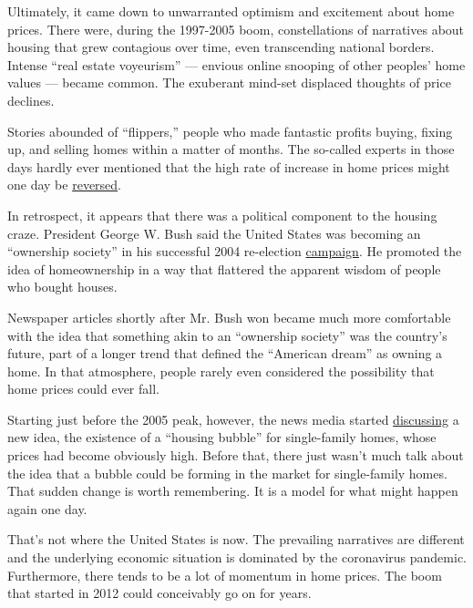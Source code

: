 Ultimately, it came down to unwarranted optimism and excitement about
home prices. There were, during the 1997-2005 boom, constellations of
narratives about housing that grew contagious over time, even
transcending national borders. Intense ``real estate voyeurism'' ---
envious online snooping of other peoples' home values --- became common.
The exuberant mind-set displaced thoughts of price declines.

Stories abounded of ``flippers,'' people who made fantastic profits
buying, fixing up, and selling homes within a matter of months. The
so-called experts in those days hardly ever mentioned that the high rate
of increase in home prices might one day be
\href{https://www.attomdata.com/news/market-trends/flipping/attom-data-solutions-q2-2019-u-s-home-flipping-report/}{reversed}.

In retrospect, it appears that there was a political component to the
housing craze. President George W. Bush said the United States was
becoming an ``ownership society'' in his successful 2004 re-election
\href{https://www.nytimes.com/2003/02/23/weekinreview/the-nation-focus-groups-to-bush-the-crowd-was-a-blur.html?searchResultPosition=1}{campaign}.
He promoted the idea of homeownership in a way that flattered the
apparent wisdom of people who bought houses.

Newspaper articles shortly after Mr. Bush won became much more
comfortable with the idea that something akin to an ``ownership
society'' was the country's future, part of a longer trend that defined
the ``American dream'' as owning a home. In that atmosphere, people
rarely even considered the possibility that home prices could ever fall.

Starting just before the 2005 peak, however, the news media started
\href{https://www.chicagotribune.com/news/ct-xpm-2004-09-19-0409190429-story.html}{discussing}
a new idea, the existence of a ``housing bubble'' for single-family
homes, whose prices had become obviously high. Before that, there just
wasn't much talk about the idea that a bubble could be forming in the
market for single-family homes. That sudden change is worth remembering.
It is a model for what might happen again one day.

That's not where the United States is now. The prevailing narratives are
different and the underlying economic situation is dominated by the
coronavirus pandemic. Furthermore, there tends to be a lot of momentum
in home prices. The boom that started in 2012 could conceivably go on
for years.

